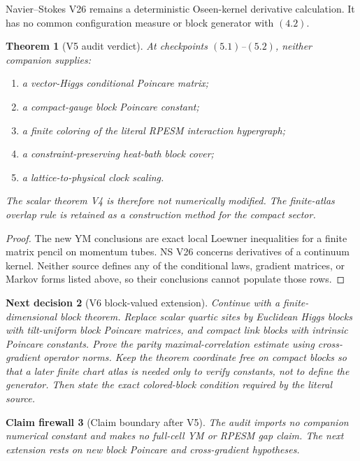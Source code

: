 \documentclass[11pt]{article}
\newtheorem{theorem}{Theorem}[section]
\newtheorem{firewall}[theorem]{Claim firewall}
\newtheorem{decision}[theorem]{Next decision}
\theoremstyle{remark}
\begin{document}
Navier--Stokes V26 remains a deterministic Oseen-kernel derivative
calculation.  It has no common configuration measure or block
generator with \((4.2)\).

\begin{theorem}[V5 audit verdict]
\label{thm:v15v5-verdict}
At checkpoints \((5.1)\)--\((5.2)\), neither companion supplies:
\begin{enumerate}
\item a vector-Higgs conditional Poincare matrix;
\item a compact-gauge block Poincare constant;
\item a finite coloring of the literal RPESM interaction
      hypergraph;
\item a constraint-preserving heat-bath block cover;
\item a lattice-to-physical clock scaling.
\end{enumerate}
The scalar theorem V4 is therefore not numerically modified.
The finite-atlas overlap rule is retained as a construction method
for the compact sector.
\end{theorem}

\begin{proof}
The new YM conclusions are exact local Loewner inequalities for a
finite matrix pencil on momentum tubes.  NS V26 concerns
derivatives of a continuum kernel.  Neither source defines any of
the conditional laws, gradient matrices, or Markov forms listed
above, so their conclusions cannot populate those rows.
\end{proof}

\begin{decision}[V6 block-valued extension]
\label{dec:v15v5-next}
Continue with a finite-dimensional block theorem.  Replace scalar
quartic sites by Euclidean Higgs blocks with tilt-uniform block
Poincare matrices, and compact link blocks with intrinsic
Poincare constants.  Prove the parity maximal-correlation estimate
using cross-gradient operator norms.  Keep the theorem coordinate
free on compact blocks so that a later finite chart atlas is
needed only to verify constants, not to define the generator.
Then state the exact colored-block condition required by the
literal source.
\end{decision}

\begin{firewall}[Claim boundary after V5]
\label{fire:v15v5}
The audit imports no companion numerical constant and makes no
full-cell YM or RPESM gap claim.  The next extension rests on new
block Poincare and cross-gradient hypotheses.
\end{firewall}
\end{document}

